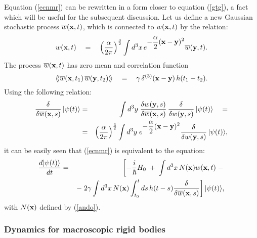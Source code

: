\documentclass[12pt]{article}
\newcommand{\llangle}{\langle\!\langle}
\newcommand{\rrangle}{\rangle\!\rangle}
\begin{document}
Equation (\ref{ecnmr}) can be rewritten in a form closer to
equation (\ref{gtg}), a fact which will be useful for the subsequent
discussion. Let us define a new Gaussian stochastic process
$\overline{w}({\bf x}, t)$, which is connected to $w({\bf x}, t)$
by the relation:
\begin{equation}
w({\bf x}, t) \quad = \quad
\left(\frac{\alpha}{2\pi}\right)^{\frac{3}{2}} \int d^{3}x\,
e^{\displaystyle -\frac{\alpha}{2} ({\bf x} - {\bf y})^{2}}
\overline{w}({\bf y}, t).
\end{equation}
The process $\overline{w}({\bf x}, t)$ has zero mean and
correlation function
\begin{equation}
\llangle \overline{w}({\bf x}, t_{1})\, \overline{w}({\bf y},
t_{2}) \rrangle \quad = \quad \gamma\, \delta^{(3)}({\bf x} - {\bf
y})\, h(t_{1} - t_{2}).
\end{equation}
Using the following relation:
\begin{eqnarray}
\frac{\delta}{\delta \overline{w}({\bf x}, s)}\, |\psi(t)\rangle &
= & \int d^{3}y\; \frac{\delta w({\bf y}, s)}{\delta
\overline{w}({\bf x}, s)}\, \frac{\delta}{\delta w({\bf y}, s)}\,
|\psi(t)\rangle
\quad = \nonumber \\
& = & \left(\frac{\alpha}{2\pi}\right)^{\frac{3}{2}} \int d^{3}y\;
e^{\displaystyle -\frac{\alpha}{2} ({\bf x} - {\bf y})^{2}}
\frac{\delta}{\delta w({\bf y}, s)}\, |\psi(t)\rangle,
\end{eqnarray}
it can be easily seen that (\ref{ecnmr}) is equivalent to the
 equation:
\begin{eqnarray} \label{ecnmr2}
\frac{d |\psi(t)\rangle}{dt} & = & \left[ -\frac{i}{\hbar} H_{0}
\; + \; \int d^{3}x\, N{(\bf x}) w({\bf x}, t) \; - \right.
\\ & &
\left. - \; 2\gamma \int d^{3}x\, N({\bf x}) \int_{t_{0}}^{t} ds\,
h(t - s) \frac{\delta}{\delta \overline{w}({\bf x}, s)}
\right]|\psi(t)\rangle, \nonumber
\end{eqnarray}
with $N{(\bf x})$ defined by (\ref{ando}).


\subsubsection{Dynamics for macroscopic rigid bodies} \label{nsec51}
\end{document}
